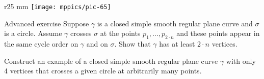 \documentclass{article}
\begin{document}
\begin{wrapfigure}[5]{r}{25 mm}
\vskip-7mm
\centering
\texttt{[image: mppics/pic-65]}
\vskip0mm
\end{wrapfigure}

\begin{thm}{Advanced exercise}\label{ex:curve-crosses-circle}
Suppose $\gamma$ is a closed simple smooth regular plane curve and $\sigma$ is a circle.
Assume $\gamma$ crosses $\sigma$ at the points $p_1,\dots,p_{2{\cdot} n}$ and these points appear in the same cycle order on $\gamma$ and on $\sigma$.
Show that $\gamma$ has at least $2\cdot n$ vertices.

Construct an example of a closed simple smooth regular plane curve $\gamma$ with only 4 vertices that crosses a given circle at arbitrarily many points. 
\end{thm}



\sloppy
\printbibliography[heading=bibintoc]
\fussy
\end{document}
